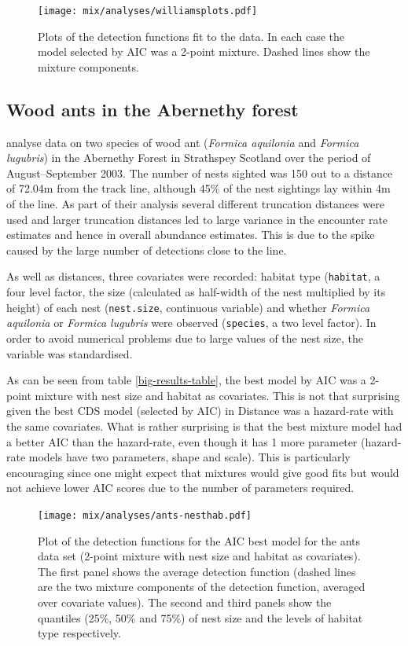 \begin{figure}
\centering
\texttt{[image: mix/analyses/williamsplots.pdf]}
\caption{Plots of the detection functions fit to the  data. In each case the model selected by AIC was a 2-point mixture. Dashed lines show the mixture components.}
\label{williams-detfcts}
\end{figure}


\subsection{Wood ants in the Abernethy forest}

 analyse data on two species of wood ant (\textit{Formica aquilonia} and \textit{Formica lugubris}) in the Abernethy Forest in Strathspey Scotland over the period of August--September 2003. The number of nests sighted was 150 out to a distance of 72.04m from the track line, although 45\% of the nest sightings lay within 4m of the line. As part of their analysis several different truncation distances were used and larger truncation distances led to large variance in the encounter rate estimates and hence in overall abundance estimates. This is due to the spike caused by the large number of detections close to the line.

As well as distances, three covariates were recorded: habitat type (\texttt{habitat}, a four level factor, the size (calculated as half-width of the nest multiplied by its height) of each nest (\texttt{nest.size}, continuous variable) and whether \textit{Formica aquilonia} or \textit{Formica lugubris} were observed (\texttt{species}, a two level factor). In order to avoid numerical problems due to large values of the nest size, the variable was standardised.

As can be seen from table \ref{big-results-table}, the best model by AIC was a 2-point mixture with nest size and habitat as covariates. This is not that surprising given the best CDS model (selected by AIC) in Distance was a hazard-rate with the same covariates. What is rather surprising is that the best mixture model had a better AIC than the hazard-rate, even though it has 1 more parameter (hazard-rate models have two parameters, shape and scale). This is particularly encouraging since one might expect that mixtures would give good fits but would not achieve lower AIC scores due to the number of parameters required.

\begin{figure}[t]
\centering
\texttt{[image: mix/analyses/ants-nesthab.pdf]}
\caption{Plot of the detection functions for the AIC best model for the ants data set (2-point mixture with nest size and habitat as covariates). The first panel shows the average detection function (dashed lines are the two mixture components of the detection function, averaged over covariate values). The second and third panels show the quantiles (25\%, 50\% and 75\%) of nest size and the levels of habitat type respectively.}
\label{ants-nesthab}
\end{figure}

